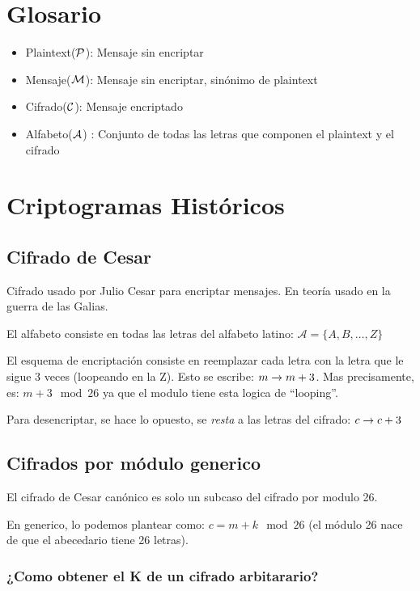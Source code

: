 \documentclass[12pt,a4paper]{report}
\begin{document}
\section{Glosario}

\begin{itemize}

\item Plaintext($\mathcal{{P}}$): Mensaje sin encriptar
\item Mensaje($\mathcal{{M}}$): Mensaje sin encriptar, sinónimo de plaintext
\item Cifrado($\mathcal{{C}}$): Mensaje encriptado
\item Alfabeto($\mathcal{{A}}$) : Conjunto de todas las letras que componen el plaintext y el cifrado

\end{itemize}


\section{Criptogramas Históricos}

\subsection{Cifrado de Cesar}
Cifrado usado por Julio Cesar para encriptar mensajes. En teoría usado en la guerra de las Galias.


El alfabeto consiste en todas las letras del alfabeto latino:
$
\mathcal{A} = \{ A, B, \dots, Z \}
$

El esquema de encriptación consiste en reemplazar cada letra con la letra que le sigue 3 veces (loopeando en la Z). Esto se escribe: $ m \rightarrow m + 3$. Mas precisamente, es: $m + 3 \mod 26$ ya que el modulo tiene esta logica de ``looping''.

Para desencriptar, se hace lo opuesto, se \textit{resta} a las letras del cifrado: $ c \rightarrow c + 3$


\subsection{Cifrados por módulo generico}

El cifrado de Cesar canónico es solo un subcaso del cifrado por modulo 26.

En generico, lo podemos plantear como: $c  = m + k \mod 26$ (el módulo 26 nace de que el abecedario tiene 26 letras).

\subsubsection{¿Como obtener el K de un cifrado arbitarario?}
\end{document}
